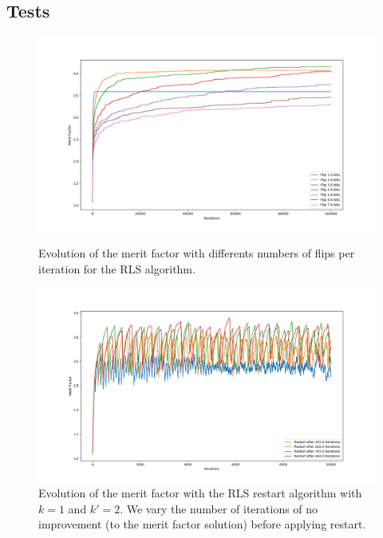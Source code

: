 \documentclass[a4paper,11pt,openany]{article}
\begin{document}
\subsection{Tests}
\begin{figure}[H]
\centering
\begin{minipage}{.45\textwidth}
  \begin{center}
  \includegraphics[scale=0.28]{Images/rls_nb_flip}
  \caption{Evolution of the merit factor with differents numbers of flips per iteration for the RLS algorithm.}
  \label{fig:rls_nb_flip}
  \end{center}
\end{minipage}%
\hfill
\begin{minipage}{.45\textwidth}
  \begin{center}
  \includegraphics[scale=0.25]{Images/rls_no_change}
  \caption{Evolution of the merit factor with the RLS restart algorithm with $k=1$ and $k'=2$. We vary the number of iterations of no improvement (to the merit factor solution) before applying restart.}
  \label{fig:rls_no_change}
  \end{center}
\end{minipage}
\end{figure}
\end{document}

